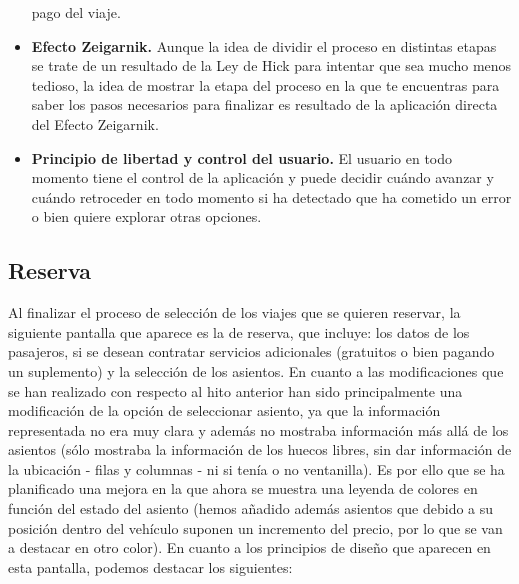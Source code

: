 \begin{itemize}
        pago del viaje.
    \item \textbf{Efecto Zeigarnik.} Aunque la idea de dividir el proceso en distintas etapas se trate de un resultado de la
        Ley de Hick para intentar que sea mucho menos tedioso, la idea de mostrar la etapa del proceso en la que te
        encuentras para saber los pasos necesarios para finalizar es resultado de la aplicación directa del Efecto
        Zeigarnik.
    \item \textbf{Principio de libertad y control del usuario.} El usuario en todo momento tiene el control de la aplicación
        y puede decidir cuándo avanzar y cuándo retroceder en todo momento si ha detectado que ha cometido un error
        o bien quiere explorar otras opciones.
\end{itemize}

\subsection*{Reserva}

Al finalizar el proceso de selección de los viajes que se quieren reservar, la siguiente pantalla que aparece es
la de reserva, que incluye: los datos de los pasajeros, si se desean contratar servicios
adicionales (gratuitos o bien pagando un suplemento) y la selección de los asientos. En cuanto a las modificaciones
que se han realizado con respecto al hito anterior han sido principalmente una modificación de la opción de seleccionar
asiento, ya que la información representada no era muy clara y además no mostraba información más allá de los asientos
(sólo mostraba la información de los huecos libres, sin dar información de la ubicación - filas y columnas - ni si
tenía o no ventanilla). Es por ello que se ha planificado una mejora en la que ahora se muestra una leyenda de
colores en función del estado del asiento (hemos añadido además asientos que debido a su posición dentro del vehículo
suponen un incremento del precio, por lo que se van a destacar en otro color). En cuanto a los principios de diseño que
aparecen en esta pantalla, podemos destacar los siguientes:

